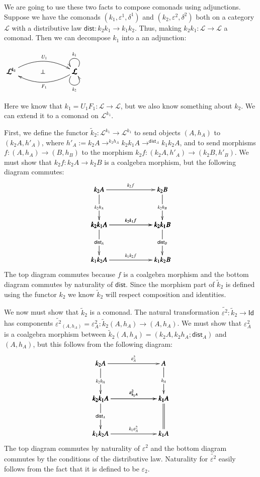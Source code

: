 \documentclass{article}
\let\mto\to
\let\to\relax
\newcommand{\to}{\rightarrow}
\newcommand{\cat}[1]{\mathcal{#1}}
\begin{document}
We are going to use these two facts to compose comonads using
adjunctions.  Suppose we have the comonads
$(k_1,\varepsilon^1,\delta^1)$ and $(k_2,\varepsilon^2,\delta^2)$ both
on a category $\cat{L}$ with a distributive law $\mathsf{dist} :
k_2k_1 \mto k_1k_2$. Thus, making $k_2k_1 : \cat{L} \mto \cat{L}$ a
comonad.  Then we can decompose $k_1$ into a an adjunction:
\begin{center}
  \begin{math}
    \bfig
    \Loop(900,0)\cat{L}(ur,ul)_{k_1}
    \Loop(900,0)\cat{L}(dl,dr)_{k_2}
    \morphism(0,0)|a|/{@{>}@/^1.5em/}/<900,0>[\cat{L}^{k_1}`\cat{L};U_1]
    \morphism(0,0)|b|/{@{<-}@/_1.5em/}/<900,0>[\cat{L}^{k_1}`\cat{L};F_1]
    \place(450,0)[\perp]
    \efig
  \end{math}
\end{center}
Here we know that $k_1 = U_1F_1 : \cat{L} \mto \cat{L}$, but we also
know something about $k_2$.  We can extend it to a comonad on
$\cat{L}^{k_1}$.

First, we define the functor $\widetilde{k}_2 : \cat{L}^{k_1} \mto
\cat{L}^{k_1}$ to send objects $(A,h_A)$ to $(k_2A,h'_A)$, where $h'_A
:= k_2A \mto^{k_2h_A} k_2k_1 A \mto^{\mathsf{dist}_A} k_1k_2 A$, and
to send morphisms $f : (A,h_A) \mto (B,h_B)$ to the morphism $k_2f :
(k_2A,h'_A) \mto (k_2B,h'_B)$.  We must show that $k_2f : k_2A \mto
k_2B$ is a coalgebra morphism, but the following diagram commutes:
\[
\bfig
\square|amma|<900,500>[
  k_2A`
  k_2B`
  k_2k_1A`
  k_2k_1B;
  k_2f`
  k_2h_A`
  k_2h_B`
  k_2k_1f]
\square(0,-500)|amma|<900,500>[
  k_2k_1A`
  k_2k_1B`
  k_1k_2A`
  k_1k_2B;
  k_2k_1f`
  \mathsf{dist}_A`
  \mathsf{dist}_B`
  k_1k_2f]
\efig
\]
The top diagram commutes because $f$ is a coalgebra morphism and the
bottom diagram commutes by naturality of $\mathsf{dist}$.  Since the
morphism part of $\widetilde{k}_2$ is defined using the functor $k_2$
we know $\widetilde{k}_2$ will respect composition and identities.

We now must show that $\widetilde{k}_2$ is a comonad.  The natural
transformation $\widetilde{\varepsilon^2} : \widetilde{k}_2 \mto
\mathsf{Id}$ has components $\widetilde{\varepsilon^2}_{(A,h_A)} =
\varepsilon^2_A : \widetilde{k}_2 (A,h_A) \mto (A,h_A)$. We must show
that $\varepsilon^2_A$ is a coalgebra morphism between
$\widetilde{k}_2 (A,h_A) = (k_2A,k_2h_A;\mathsf{dist}_A)$ and
$(A,h_A)$, but this follows from the following diagram:
\[
\bfig
\square|amma|/->`->`->`->/<900,500>[
  k_2A`
  A`
  k_2k_1A`
  k_1A;
  \varepsilon^2_A`
  k_2h_A`
  h_A`
  \varepsilon^2_{k_1A}]
\square(0,-500)|amma|/->`->`=`->/<900,500>[
  k_2k_1A`
  k_1A`
  k_1k_2A`
  k_1A;
  \varepsilon^2_{k_1A}`
  \mathsf{dist}_A``
  k_1\varepsilon^2_A]
\efig
\]
The top diagram commutes by naturality of $\varepsilon^2$ and the
bottom diagram commutes by the conditions of the distributive law.
Naturality for $\widetilde{\varepsilon^2}$ easily follows from the
fact that it is defined to be $\varepsilon_2$.
\end{document}
